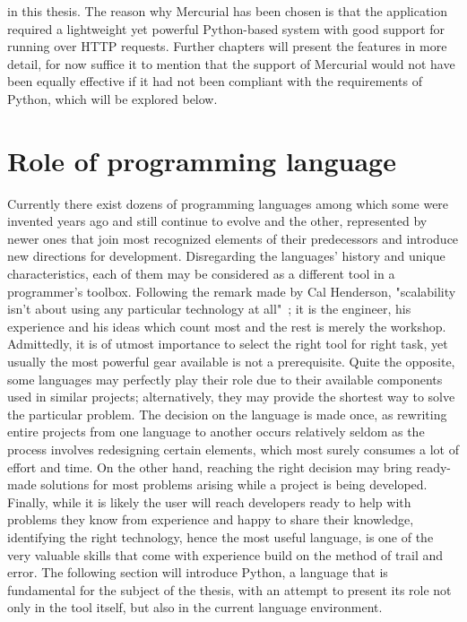 in this thesis. The reason why Mercurial has been chosen is that the application required a lightweight yet powerful Python-based system with good support for running over HTTP requests. Further chapters will present the features in more detail, for now suffice it to mention that the support of Mercurial would not have been equally effective if it had not been compliant with the requirements of Python, which will be explored below.

\section{Role of programming language}\label{sec:languages}
Currently there exist dozens of programming languages among which some were invented years ago and still continue to evolve and the other, represented by newer ones that join most recognized elements of their predecessors and introduce new directions for development. Disregarding the languages' history and unique characteristics, each of them may be considered as a different tool in a programmer's toolbox. Following the remark made by Cal Henderson, "scalability isn't about using any particular technology at all"~\cite[page 203]{build_scalable}; it is the engineer, his experience and his ideas which count most and the rest is merely the workshop. Admittedly, it is of utmost importance to select the right tool for right task, yet usually the most powerful gear available is not a prerequisite. Quite the opposite, some languages may perfectly play their role due to their available components used in similar projects; alternatively, they may provide the shortest way to solve the particular problem. The decision on the language is made once, as rewriting entire projects from one language to another occurs relatively seldom as the process involves redesigning certain elements, which most surely consumes a lot of effort and time. On the other hand, reaching the right decision may bring ready-made solutions for most problems arising while a project is being developed. Finally, while it is likely the user will reach developers ready to help with problems they know from experience and happy to share their knowledge, identifying the right technology, hence the most useful language, is one of the very valuable skills that come with experience build on the method of trail and error. 
The following section will introduce Python, a language that is fundamental for the subject of the thesis, with an attempt to present its role not only in the tool itself, but also in the current language environment.
  
